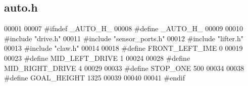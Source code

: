 \subsection{auto.\+h}
\label{auto_8h_source}

\begin{DoxyCode}
00001 
00007 \textcolor{preprocessor}{#ifndef \_AUTO\_H\_}
00008 \textcolor{preprocessor}{#define \_AUTO\_H\_}
00009 
00010 \textcolor{preprocessor}{#include "drive.h"}
00011 \textcolor{preprocessor}{#include "sensor_ports.h"}
00012 \textcolor{preprocessor}{#include "lifter.h"}
00013 \textcolor{preprocessor}{#include "claw.h"}
00014 
00018 \textcolor{preprocessor}{#define FRONT\_LEFT\_IME 0}
00019 
00023 \textcolor{preprocessor}{#define MID\_LEFT\_DRIVE 1}
00024 
00028 \textcolor{preprocessor}{#define MID\_RIGHT\_DRIVE 4}
00029 
00033 \textcolor{preprocessor}{#define STOP\_ONE 500}
00034 
00038 \textcolor{preprocessor}{#define GOAL\_HEIGHT 1325}
00039 
00040 
00041 \textcolor{preprocessor}{#endif}
\end{DoxyCode}
